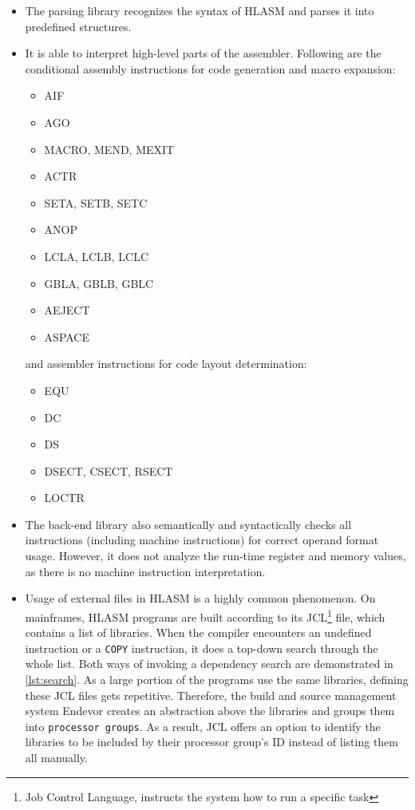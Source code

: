\begin{itemize}
\item The parsing library recognizes the syntax of HLASM and parses it into predefined structures. 

\item It is able to interpret high-level parts of the assembler. Following are the conditional assembly instructions for code generation and macro expansion:
\begin{itemize}
    \item AIF
    \item AGO
    \item MACRO, MEND, MEXIT
    \item ACTR
    \item SETA, SETB, SETC
    \item ANOP
    \item LCLA, LCLB, LCLC
    \item GBLA, GBLB, GBLC
    \item AEJECT
    \item ASPACE
\end{itemize}
and assembler instructions for code layout determination:
\begin{itemize}
    \item EQU 
    \item DC 
    \item DS 
    \item DSECT, CSECT, RSECT 
    \item LOCTR
\end{itemize}

\item The back-end library also semantically and syntactically checks all instructions (including machine instructions) for correct operand format usage. However, it does not analyze the run-time register and memory values, as there is no machine instruction interpretation.

\item Usage of external files in HLASM is a highly common phenomenon. On mainframes, HLASM programs are built according to its JCL\footnote{Job Control Language, instructs the system how to run a specific task} file, which contains a list of libraries. When the compiler encounters an undefined instruction or a \texttt{COPY} instruction, it does a top-down search through the whole list. Both ways of invoking a dependency search are demonstrated in \cref{lst:search}. As a large portion of the programs use the same libraries, defining these JCL files gets repetitive. Therefore, the build and source management system Endevor creates an abstraction above the libraries and groups them into \texttt{processor groups}. As a result, JCL offers an option to identify the libraries to be included by their processor group's ID instead of listing them all manually.


\end{itemize}

